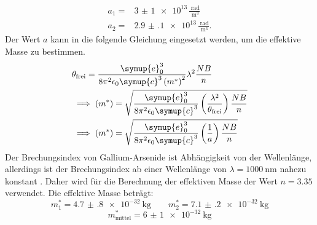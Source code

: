 \begin{align*}
  a_{\text{1}} =& \num{3(1)e13}  \,\frac{\SI{}{\radian}}{\SI{}{\cubic\meter}}\\
  a_{\text{2}} =& \num{2.9(1)e13}\,\frac{\SI{}{\radian}}{\SI{}{\cubic\meter}}.
\end{align*}
Der Wert $a$ kann in die folgende Gleichung eingesetzt werden, um die effektive Masse zu bestimmen.
\begin{align*}
  &\theta_{\text{frei}} = \frac{\symup{e}_0^3}{8\pi^2\epsilon_0\symup{c}^3 \left(m^*\right)^2}\lambda^2\frac{NB}{n}\\
  &\implies \left(m^*\right)=\sqrt{\frac{\symup{e}_0^3}{8\pi^2\epsilon_0\symup{c}^3} \left(\frac{\lambda^2}{\theta_{\text{frei}}}\right)\frac{NB}{n} }\\
  &\implies \left(m^*\right)=\sqrt{\frac{\symup{e}_0^3}{8\pi^2\epsilon_0\symup{c}^3} \left(\frac{1}{a}\right)\frac{NB}{n} }
\end{align*}
Der Brechungsindex von Gallium-Arsenide ist Abhängigkeit von der Wellenlänge, allerdings ist der Brechungsindex ab 
einer Wellenlänge von $\lambda=\SI{1000}{\nano\meter}$ nahezu konstant \cite{Brechungsindex}. Daher wird 
für die Berechnung der effektiven Masse der Wert $n=\num{3.35}$ verwendet.
Die effektive Masse beträgt:
\begin{equation*}
  m^*_1 = \SI{4.7(8)e-32}{\kilo\gram}\qquad m^*_2 = \SI{7.1(2)e-32}{\kilo\gram}
\end{equation*}
\begin{equation*}
  m^*_{\text{mittel}}=\SI{6(1)e-32}{\kilo\gram}
\end{equation*}